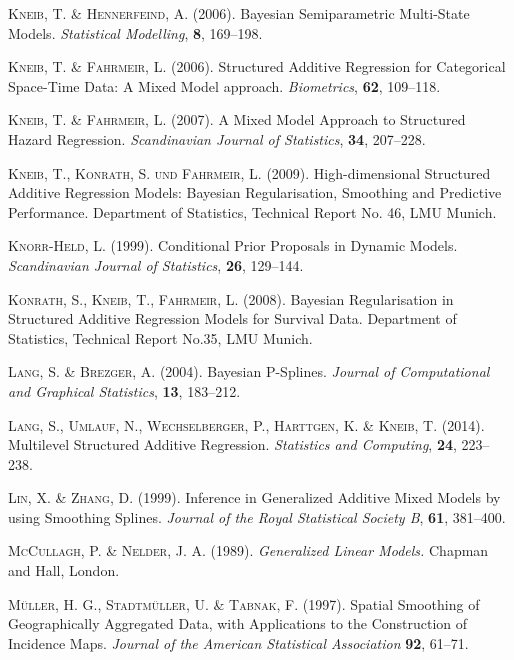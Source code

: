 \documentclass[11pt,a4paper,twoside]{bayesxarticle}
\begin{document}
\begin{thebibliography}{99}
 {\scshape Kneib, T. \& Hennerfeind, A.} (2006).
 Bayesian Semiparametric Multi-State Models.
 {\it Statistical Modelling}, {\bf 8}, 169--198.

 {\scshape Kneib, T. \& Fahrmeir, L.} (2006).
 Structured Additive Regression for Categorical Space-Time Data: A Mixed Model approach.
 {\it Biometrics}, {\bf 62}, 109--118.

 {\scshape Kneib, T. \& Fahrmeir, L.} (2007).
 A Mixed Model Approach to Structured Hazard Regression.
 {\it Scandinavian Journal of Statistics}, {\bf 34}, 207--228.

 {\scshape Kneib, T., Konrath, S. und Fahrmeir, L.} (2009). High-dimensional
 Structured Additive Regression Models: Bayesian Regularisation, Smoothing and Predictive
 Performance. Department of Statistics, Technical Report No. 46, LMU Munich.

 {\scshape Knorr-Held, L.} (1999).
 Conditional Prior Proposals in Dynamic Models.
 {\it Scandinavian Journal of Statistics}, {\bf 26}, 129--144.

 {\scshape Konrath, S., Kneib, T., Fahrmeir, L.} (2008). Bayesian Regularisation
 in Structured Additive Regression Models for Survival Data. Department of Statistics,
 Technical Report No.35, LMU Munich.

 {\scshape Lang, S. \& Brezger, A.} (2004).
 Bayesian P-Splines.
 {\it Journal of Computational and Graphical Statistics}, {\bf 13}, 183--212.

 {\scshape Lang, S., Umlauf, N., Wechselberger, P., Harttgen, K.  \& Kneib, T.} (2014).
 Multilevel Structured Additive Regression.
 {\it Statistics and Computing}, {\bf 24}, 223--238.


 {\scshape Lin, X. \& Zhang, D.} (1999).
 Inference in Generalized Additive Mixed Models by using Smoothing Splines.
 {\it Journal of the Royal Statistical Society B}, {\bf 61}, 381--400.

 {\scshape McCullagh, P. \& Nelder, J. A.} (1989).
 {\it Generalized Linear Models.}
 Chapman and Hall, London.

 {\scshape M\"{u}ller, H. G., Stadtm\"{u}ller, U. \& Tabnak, F.} (1997).
 Spatial Smoothing of Geographically Aggregated Data, with Applications to the Construction of Incidence Maps.
 {\it Journal of the American Statistical Association} {\bf 92}, 61--71.


\end{thebibliography}
\end{document}
